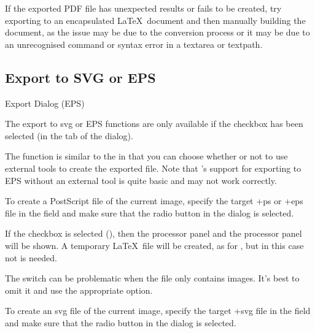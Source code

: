 If the exported PDF file has unexpected results or fails to be
created, try exporting to an encapsulated \LaTeX\ document and then
manually building the document, as the issue may be due to the
conversion process or it may be due to an unrecognised command or
syntax error in a \gls{textarea} or \gls{textpath}.


\subsection{Export to SVG or EPS}\label{sec:exportsvgeps}

 {}
 {Export Dialog (EPS)}

The export to \gls{svg} or EPS functions are only available if the
 checkbox has been selected
(in the  tab of the  dialog).


The  function is similar to the 
in that you can choose whether or not to use external tools to
create the exported file. Note that \FlowframTk's support for
exporting to EPS without an external tool is quite basic and may not
work correctly.

To create a PostScript file of the current image, specify the target
\ext+{ps} or \ext+{eps} file in the  field and
make sure that the  radio button in the
 dialog is selected. 

If the  checkbox is
selected (), then the
 processor panel and the
 processor panel will be shown.
A temporary \LaTeX\ file will be created, as for
, but in this case  not
 is needed.

\begin{warning}
The   switch can be problematic when the file only
contains images. It's best to omit it and use the appropriate
 option.
\end{warning}


To create an \gls{svg} file of the current image, specify the target
\ext+{svg} file in the  field and
make sure that the  radio button in the
 dialog is selected. 

